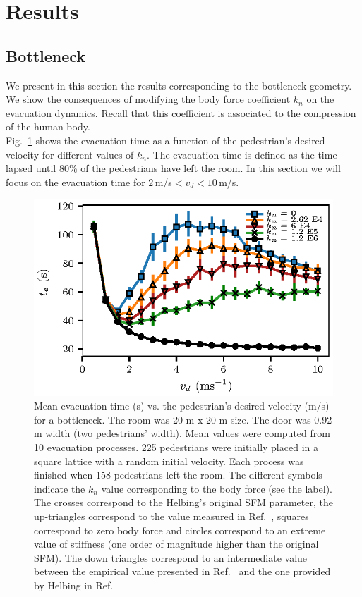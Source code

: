 \documentclass[preprint,12pt]{elsarticle}
\begin{document}
\section{\label{results}Results}


\subsection{\label{bottleneck} Bottleneck}


We present in this section the results corresponding to the bottleneck geometry.
We show the consequences of modifying the body force coefficient $k_n$ on the
evacuation dynamics. Recall that this coefficient is associated  to the
compression of the human body. \\

Fig.~\ref{vd_vs_te} shows the evacuation time as a function of the pedestrian's
desired velocity for different values of $k_n$. The evacuation  time is defined
as the time lapsed until 80\% of the pedestrians have  left the room. In this
section we will focus on the evacuation time for  $2\,$m/s$<v_d<10\,$m/s.\\


\begin{figure}[htbp!]
\centering
\includegraphics[width=0.7\columnwidth]{./vd_vs_te_N225.eps}

\caption{\label{vd_vs_te}Mean evacuation time (s) vs. the pedestrian’s desired
velocity (m/s) for a bottleneck. The room was 20 m x 20 m size. The door was
0.92 m width (two pedestrians' width). Mean values were computed from 10
evacuation processes. 225  pedestrians were initially placed in a square lattice
with a random initial  velocity. Each process was finished when 158 pedestrians
left the room. The  different symbols indicate the $k_n$ value corresponding to
the body force (see  the label). The crosses correspond to the Helbing's
original SFM parameter, the  up-triangles correspond to the value measured in
Ref.~\cite{melvin1988aatd}, squares correspond  to zero body force and circles
correspond to an extreme value of stiffness (one  order of magnitude higher than
the original SFM). The   down triangles correspond to an intermediate value
between the empirical value  presented in Ref.~\cite{melvin1988aatd} and the one
provided by Helbing in  Ref.~\cite{helbing_2000} }

\end{figure}
\end{document}
